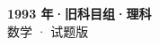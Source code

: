 \documentclass[zihao=-4, a4paper]{ctexart}
\begin{document}
\begin{center}
  {\Large\bfseries 1993 年·旧科目组·理科}\\[4pt]
  {\large 数学 · 试题版}
\end{center}
\medskip
{}

\end{document}
